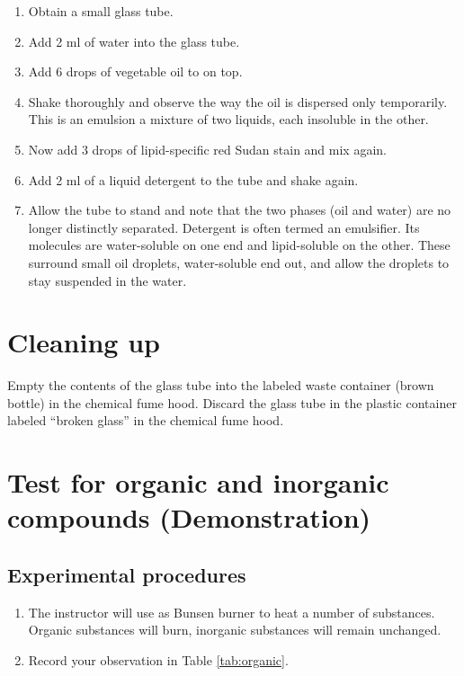 \begin{enumerate}
\def\labelenumi{\arabic{enumi}.}
\tightlist
\item
  Obtain a small glass tube.
\item
  Add 2 ml of water into the glass tube.
\item
  Add 6 drops of vegetable oil to on top.
\item
  Shake thoroughly and observe the way the oil is dispersed only
  temporarily. This is an emulsion a mixture of two liquids, each
  insoluble in the other.
\item
  Now add 3 drops of lipid-specific red Sudan stain and mix again.
\item
  Add 2 ml of a liquid detergent to the tube and shake again.
\item
  Allow the tube to stand and note that the two phases (oil and water)
  are no longer distinctly separated. Detergent is often termed an
  emulsifier. Its molecules are water-soluble on one end and
  lipid-soluble on the other. These surround small oil droplets,
  water-soluble end out, and allow the droplets to stay suspended in the
  water.
\end{enumerate}

\section{Cleaning up}\label{cleaning-up-1}

Empty the contents of the glass tube into the labeled waste container
(brown bottle) in the chemical fume hood. Discard the glass tube in the
plastic container labeled ``broken glass'' in the chemical fume hood.

\section{Test for organic and inorganic compounds
(Demonstration)}\label{test-for-organic-and-inorganic-compounds-demonstration}

\subsection{Experimental procedures}\label{experimental-procedures-5}

\begin{enumerate}
\def\labelenumi{\arabic{enumi}.}
\tightlist
\item
  The instructor will use as Bunsen burner to heat a number of
  substances. Organic substances will burn, inorganic substances will
  remain unchanged.
\item
  Record your observation in Table \ref{tab:organic}.
\end{enumerate}

